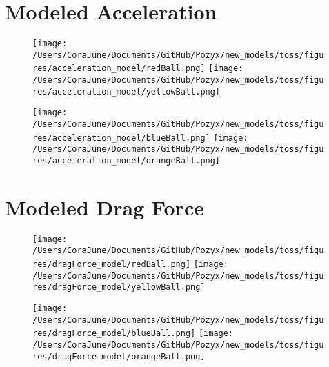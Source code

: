 \documentclass{article}
\begin{document}
\section{Modeled Acceleration}
\begin{figure}[h!]
\begin{multicols}{2}
    \texttt{[image: /Users/CoraJune/Documents/GitHub/Pozyx/new\_models/toss/figures/acceleration\_model/redBall.png]}
    \texttt{[image: /Users/CoraJune/Documents/GitHub/Pozyx/new\_models/toss/figures/acceleration\_model/yellowBall.png]}
\end{multicols}

\begin{multicols}{2}
    \texttt{[image: /Users/CoraJune/Documents/GitHub/Pozyx/new\_models/toss/figures/acceleration\_model/blueBall.png]}
    \texttt{[image: /Users/CoraJune/Documents/GitHub/Pozyx/new\_models/toss/figures/acceleration\_model/orangeBall.png]}
\end{multicols}

\end{figure}
\newpage
\section{Modeled Drag Force}
\begin{figure}[h!]
\begin{multicols}{2}
    \texttt{[image: /Users/CoraJune/Documents/GitHub/Pozyx/new\_models/toss/figures/dragForce\_model/redBall.png]}
    \texttt{[image: /Users/CoraJune/Documents/GitHub/Pozyx/new\_models/toss/figures/dragForce\_model/yellowBall.png]}
\end{multicols}

\begin{multicols}{2}
    \texttt{[image: /Users/CoraJune/Documents/GitHub/Pozyx/new\_models/toss/figures/dragForce\_model/blueBall.png]}
    \texttt{[image: /Users/CoraJune/Documents/GitHub/Pozyx/new\_models/toss/figures/dragForce\_model/orangeBall.png]}
\end{multicols}

\end{figure}
\newpage
\end{document}
